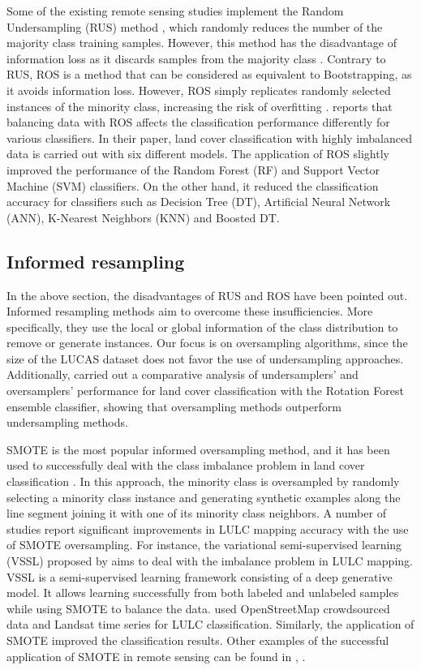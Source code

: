 \documentclass[remotesensing,article,submit,moreauthors,pdftex]{Definitions/mdpi}
\begin{document}
Some of the existing remote sensing studies implement the Random Undersampling
(RUS) method \cite{Azadbakht2016}, which randomly reduces the number of the
majority class training samples. However, this method has the disadvantage of
information loss as it discards samples from the majority class
\cite{Feng2019}. Contrary to RUS, ROS is a method that can be considered as
equivalent to Bootstrapping, as it avoids information loss. However, ROS simply
replicates randomly selected instances of the minority class, increasing the
risk of overfitting \cite{Krawczyk2016}. \cite{Maxwell2018} reports that
balancing data with ROS affects the classification performance differently for
various classifiers. In their paper, land cover classification with highly
imbalanced data is carried out with six different models. The application of
ROS slightly improved the performance of the Random Forest (RF) and Support
Vector Machine (SVM) classifiers. On the other hand, it reduced the
classification accuracy for classifiers such as Decision Tree (DT), Artificial
Neural Network (ANN), K-Nearest Neighbors (KNN) and Boosted DT.

\subsection{Informed resampling}

In the above section, the disadvantages of RUS and ROS have been pointed out.
Informed resampling methods aim to overcome these insufficiencies. More
specifically, they use the local or global information of the class distribution to
remove or generate instances. Our focus is on oversampling algorithms, since the
size of the LUCAS dataset does not favor the use of undersampling approaches.
Additionally, \cite{Feng2018} carried out a comparative analysis of
undersamplers' and oversamplers' performance for land cover classification with
the Rotation Forest ensemble classifier, showing that oversampling methods
outperform undersampling methods.

SMOTE is the most popular informed oversampling method, and it has been used to
successfully deal with the class imbalance problem in land cover classification
\cite{Cenggoro2018}. In this approach, the minority class is oversampled by
randomly selecting a minority class instance and generating synthetic examples
along the line segment joining it with one of its minority class neighbors. A
number of studies report significant improvements in LULC mapping accuracy with
the use of SMOTE oversampling. For instance, the variational semi-supervised
learning (VSSL) proposed by \cite{Cenggoro2018} aims to deal with the imbalance
problem in LULC mapping. VSSL is a semi-supervised learning framework consisting
of a deep generative model. It allows learning successfully from both labeled
and unlabeled samples while using SMOTE to balance the data. \cite{Johnson2016}
used OpenStreetMap crowdsourced data and Landsat time series for LULC
classification. Similarly, the application of SMOTE improved the classification
results. Other examples of the successful application of SMOTE in remote sensing
can be found in \cite{Bogner2018}, \cite{Panda2018}.
\end{document}
